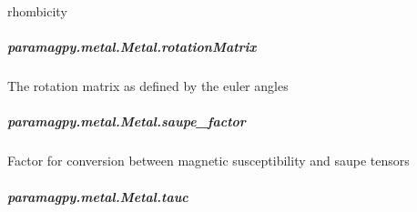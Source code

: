 \documentclass[a4paper,10pt,english,openany,oneside]{sphinxmanual}
\begin{document}
\begin{fulllineitems}
\begin{fulllineitems}
\begin{fulllineitems}
\label{\detokenize{reference/generated/paramagpy.metal.Metal.rh:paramagpy.metal.Metal.rh}}
\sphinxAtStartPar
rhombicity

\end{fulllineitems}



\subparagraph{paramagpy.metal.Metal.rotationMatrix}
\label{\detokenize{reference/generated/paramagpy.metal.Metal.rotationMatrix:paramagpy-metal-metal-rotationmatrix}}\label{\detokenize{reference/generated/paramagpy.metal.Metal.rotationMatrix::doc}}

\begin{fulllineitems}
\label{\detokenize{reference/generated/paramagpy.metal.Metal.rotationMatrix:paramagpy.metal.Metal.rotationMatrix}}
\sphinxAtStartPar
The rotation matrix as defined by the euler angles

\end{fulllineitems}



\subparagraph{paramagpy.metal.Metal.saupe\_factor}
\label{\detokenize{reference/generated/paramagpy.metal.Metal.saupe_factor:paramagpy-metal-metal-saupe-factor}}\label{\detokenize{reference/generated/paramagpy.metal.Metal.saupe_factor::doc}}

\begin{fulllineitems}
\label{\detokenize{reference/generated/paramagpy.metal.Metal.saupe_factor:paramagpy.metal.Metal.saupe_factor}}
\sphinxAtStartPar
Factor for conversion between magnetic susceptibility
and saupe tensors

\end{fulllineitems}



\subparagraph{paramagpy.metal.Metal.tauc}
\label{\detokenize{reference/generated/paramagpy.metal.Metal.tauc:paramagpy-metal-metal-tauc}}\label{\detokenize{reference/generated/paramagpy.metal.Metal.tauc::doc}}


\end{fulllineitems}
\end{fulllineitems}
\end{document}

